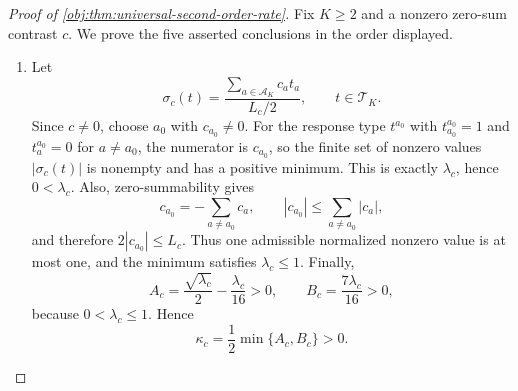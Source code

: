 \begin{proof}[Proof of \cref{obj:thm:universal-second-order-rate}]
Fix \(K\ge 2\) and a nonzero zero-sum contrast \(c\). We prove the five asserted conclusions in the order displayed.

\begin{enumerate}
\item Let
\[
\sigma_c(t)=\frac{\sum_{a\in\mathcal A_K}c_a t_a}{L_c/2},
\qquad t\in\mathcal T_K .
\]
Since \(c\neq 0\), choose \(a_0\) with \(c_{a_0}\neq 0\). For the response type \(t^{a_0}\) with \(t^{a_0}_{a_0}=1\) and \(t^{a_0}_a=0\) for \(a\neq a_0\), the numerator is \(c_{a_0}\), so the finite set of nonzero values \(|\sigma_c(t)|\) is nonempty and has a positive minimum. This is exactly \(\lambda_c\), hence \(0<\lambda_c\). Also, zero-summability gives
\[
c_{a_0}=-\sum_{a\neq a_0}c_a,
\qquad
|c_{a_0}|\le \sum_{a\neq a_0}|c_a|,
\]
and therefore \(2|c_{a_0}|\le L_c\). Thus one admissible normalized nonzero value is at most one, and the minimum satisfies \(\lambda_c\le 1\). Finally,
\[
A_c=\frac{\sqrt{\lambda_c}}2-\frac{\lambda_c}{16}>0,
\qquad
B_c=\frac{7\lambda_c}{16}>0,
\]
because \(0<\lambda_c\le 1\). Hence
\[
\kappa_c=\frac12\min\{A_c,B_c\}>0 .
\]


\end{enumerate}
\end{proof}
